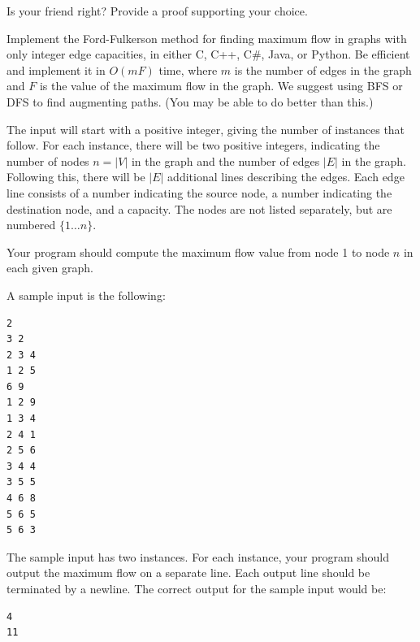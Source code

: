 \documentclass[solutionorbox,answers]{exam} %
\begin{document}
\begin{questions}
Is your friend right? Provide a proof supporting your choice.
\begin{solutionbox}{3in}


\end{solutionbox}

\newpage

\question Implement the Ford-Fulkerson method for finding maximum flow in graphs with only integer edge capacities, in either C, C++, C\#, Java, or Python. Be efficient and implement it in $O(mF)$ time, where $m$ is the number of edges in the graph and $F$ is the value of the maximum flow in the graph. We suggest using BFS or DFS to find augmenting paths. (You may be able to do better than this.)

The input will start with a positive integer, giving the number of instances that follow. For each instance, there will be two positive integers, indicating the number of nodes $n = |V|$ in the graph and the number of edges $|E|$ in the graph. Following this, there will be $|E|$ additional lines describing the edges. Each edge line consists of a number indicating the source node, a number indicating the destination node, and a capacity. The nodes are not listed separately, but are numbered $\{1\ldots n\}$.

Your program should compute the maximum flow value from node 1 to node $n$ in each given graph.

A sample input is the following:

\begin{verbatim}
2
3 2
2 3 4
1 2 5
6 9
1 2 9
1 3 4
2 4 1
2 5 6
3 4 4
3 5 5
4 6 8
5 6 5
5 6 3
\end{verbatim}

The sample input has two instances. For each instance, your program should output the maximum flow on a separate line. Each output line should be terminated by a newline. The correct output for the sample input would be:
\begin{verbatim}
4
11
\end{verbatim}

\end{questions}
\end{document}
